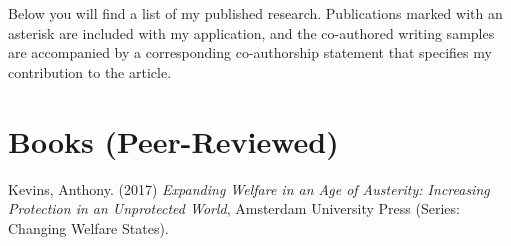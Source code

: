\documentclass[letterpaper,fontsize=10pt]{scrartcl}
\newenvironment{modenumerate}
  {\enumerate\setupmodenumerate}
  {\endenumerate}
\newif\ifmoditem
\newcommand{\setupmodenumerate}{%
  \global\moditemfalse
  \let\origmakelabel\makelabel
  \def\moditem##1{\global\moditemtrue\def\mesymbol{##1}\item}%
  \def\makelabel##1{%
    \origmakelabel{##1\ifmoditem\rlap{\mesymbol}\fi\enspace}%
    \global\moditemfalse}%
}
\begin{document}
\sloppy

Below you will find a list of my published research. Publications marked with an asterisk are included with my application, and the co-authored writing samples are accompanied by a corresponding co-authorship statement that specifies my contribution to the article.

\section{Books (Peer-Reviewed)}
\vspace{-1.5em}
\begin{modenumerate}
	\moditem{*}	Kevins, Anthony. (2017) \textit{Expanding Welfare in an Age of Austerity: Increasing Protection in an Unprotected World}, Amsterdam University Press (Series: Changing Welfare States).
\end{modenumerate}

\vspace{-.25em}
\end{document}

